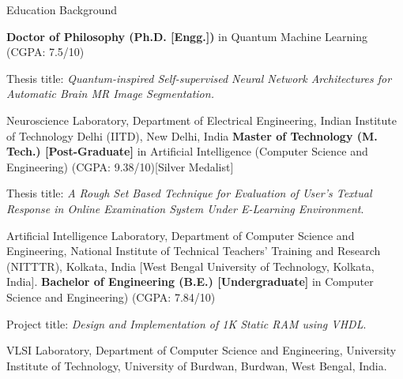 \begin{rubric}{Education Background}

%
	\textbf{Doctor of Philosophy (Ph.D. [Engg.])} in Quantum Machine Learning (CGPA: 7.5/10)
	\par Thesis title: \emph{Quantum-inspired Self-supervised Neural Network Architectures for Automatic Brain MR Image Segmentation.}
	\par Neuroscience Laboratory, Department of Electrical Engineering, Indian Institute of Technology Delhi (IITD), New Delhi, India
%
	\textbf{Master of Technology (M. Tech.) [Post-Graduate]} in Artificial Intelligence (Computer Science and Engineering) (CGPA: 9.38/10)[Silver Medalist]
	\par Thesis title: \emph{A Rough Set Based Technique for Evaluation of User’s Textual Response in Online Examination System Under E-Learning Environment}.
	\par Artificial Intelligence Laboratory, Department of Computer Science and Engineering, National Institute of Technical Teachers’ Training and Research (NITTTR), Kolkata, India [West Bengal University of Technology, Kolkata, India].
	\textbf{Bachelor of Engineering (B.E.) [Undergraduate]} in Computer Science and Engineering) (CGPA: 7.84/10)
	\par Project title: \emph{Design and Implementation of 1K Static RAM using VHDL}.
	\par VLSI Laboratory, Department of Computer Science and Engineering, University Institute of Technology, University of Burdwan, Burdwan, West Bengal, India.
\end{rubric}